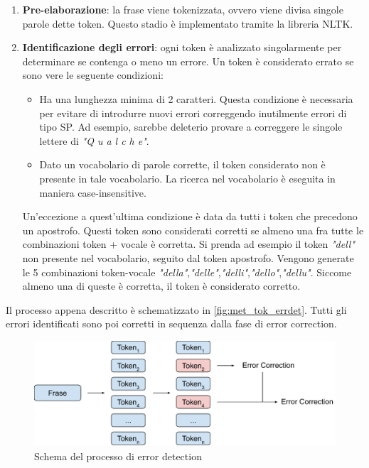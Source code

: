 \begin{enumerate}
\item \textbf{Pre-elaborazione}: la frase viene tokenizzata, ovvero viene divisa singole parole dette token. Questo stadio è implementato tramite la libreria NLTK\cite{nltk}.
\item \textbf{Identificazione degli errori}: ogni token è analizzato singolarmente per determinare se contenga o meno un errore. Un token è considerato errato se sono vere le seguente condizioni:
	\begin{itemize}
	\item Ha una lunghezza minima di 2 caratteri. Questa condizione è necessaria per evitare di introdurre nuovi errori correggendo inutilmente errori di tipo SP. Ad esempio, sarebbe deleterio provare a correggere le singole lettere di \textit{"Q u a l c h e"}.
	\item Dato un vocabolario di parole corrette, il token considerato non è presente in tale vocabolario. La ricerca nel vocabolario è eseguita in maniera case-insensitive.
	\end{itemize}
Un'eccezione a quest'ultima condizione è data da tutti i token che precedono un apostrofo. Questi token sono considerati corretti se almeno una fra tutte le combinazioni token + vocale è corretta. Si prenda ad esempio il token \textit{"dell"} non presente nel vocabolario, seguito dal token apostrofo. Vengono generate le 5 combinazioni token-vocale \textit{"della"},\textit{"delle"},\textit{"delli"},\textit{"dello"},\textit{"dellu"}. Siccome almeno una di queste è corretta, il token è considerato corretto.
\end{enumerate}

Il processo appena descritto è schematizzato in \autoref{fig:met_tok_errdet}. Tutti gli errori identificati sono poi corretti in sequenza dalla fase di error correction. 

\begin{figure}[H]
\centering
\includegraphics[width=\textwidth]{immagini/metodologia/error_detection}
\caption{Schema del processo di error detection}
\label{fig:met_tok_errdet}
\end{figure}

